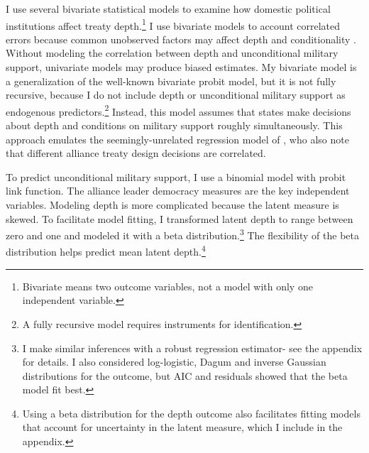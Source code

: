 \documentclass[12pt]{article}
\begin{document}
I use several bivariate statistical models to examine how domestic political institutions affect treaty depth.\footnote{Bivariate means two outcome variables, not a model with only one independent variable.} 
I use bivariate models to account correlated errors because common unobserved factors may affect depth and conditionality \citep{Braumoelleretal2018}.
Without modeling the correlation between depth and unconditional military support, univariate models may produce biased estimates. 
My bivariate model is a generalization of the well-known bivariate probit model, but it is not fully recursive, because I do not include depth or unconditional military support as endogenous predictors.\footnote{A fully recursive model requires instruments for identification.}  
Instead, this model assumes that states make decisions about depth and conditions on military support roughly simultaneously. 
This approach emulates the seemingly-unrelated regression model of \citet{FjelstulReiter2019}, who also note that different alliance treaty design decisions are correlated. 


To predict unconditional military support, I use a binomial model with probit link function. 
The alliance leader democracy measures are the key independent variables.
Modeling depth is more complicated because the latent measure is skewed.
To facilitate model fitting, I transformed latent depth to range between zero and one and modeled it with a beta distribution.\footnote{I make similar inferences with a robust regression estimator- see the appendix for details. I also considered log-logistic, Dagum and inverse Gaussian distributions for the outcome, but AIC and residuals showed that the beta model fit best.}
The flexibility of the beta distribution helps predict mean latent depth.\footnote{Using a beta distribution for the depth outcome also facilitates fitting models that account for uncertainty in the latent measure, which I include in the appendix.} 
\end{document}
